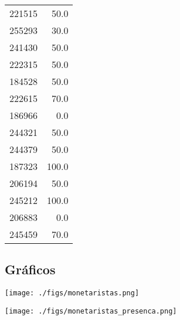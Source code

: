 \documentclass[11pt]{article}
\begin{document}
\begin{tabular}{lr}
221515 &                  50.0 \\
255293 &                  30.0 \\
241430 &                  50.0 \\
222315 &                  50.0 \\
184528 &                  50.0 \\
222615 &                  70.0 \\
186966 &                   0.0 \\
244321 &                  50.0 \\
244379 &                  50.0 \\
187323 &                 100.0 \\
206194 &                  50.0 \\
245212 &                 100.0 \\
206883 &                   0.0 \\
245459 &                  70.0 \\
\bottomrule
\end{tabular}

\subsection{Gráficos}
\label{sec:org6c3ab9d}

\begin{center}
\texttt{[image: ./figs/monetaristas.png]}
\end{center}

\begin{center}
\texttt{[image: ./figs/monetaristas\_presenca.png]}
\end{center}
\end{document}
